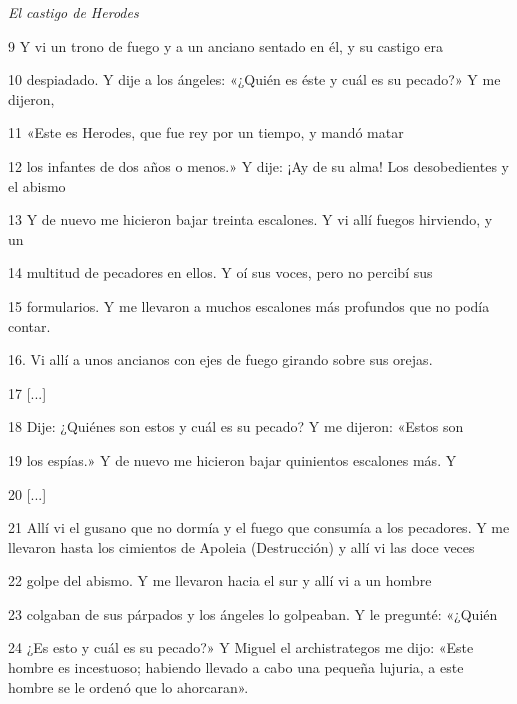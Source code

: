 \par \textit{El castigo de Herodes}

\par 9 Y vi un trono de fuego y a un anciano sentado en él, y su castigo era

\par 10 despiadado. Y dije a los ángeles: «¿Quién es éste y cuál es su pecado?» Y me dijeron,

\par 11 «Este es Herodes, que fue rey por un tiempo, y mandó matar

\par 12 los infantes de dos años o menos.» Y dije: ¡Ay de su alma! Los desobedientes y el abismo

\par 13 Y de nuevo me hicieron bajar treinta escalones. Y vi allí fuegos hirviendo, y un

\par 14 multitud de pecadores en ellos. Y oí sus voces, pero no percibí sus

\par 15 formularios. Y me llevaron a muchos escalones más profundos que no podía contar.

16. Vi allí a unos ancianos con ejes de fuego girando sobre sus orejas.

\par 17 [...]

\par 18 Dije: ¿Quiénes son estos y cuál es su pecado? Y me dijeron: «Estos son

\par 19 los espías.» Y de nuevo me hicieron bajar quinientos escalones más. Y

\par 20 [...]

\par 21 Allí vi el gusano que no dormía y el fuego que consumía a los pecadores. Y me llevaron hasta los cimientos de Apoleia (Destrucción) y allí vi las doce veces

\par 22 golpe del abismo. Y me llevaron hacia el sur y allí vi a un hombre

\par 23 colgaban de sus párpados y los ángeles lo golpeaban. Y le pregunté: «¿Quién

\par 24 ¿Es esto y cuál es su pecado?» Y Miguel el archistrategos me dijo: «Este hombre es incestuoso; habiendo llevado a cabo una pequeña lujuria, a este hombre se le ordenó que lo ahorcaran».

